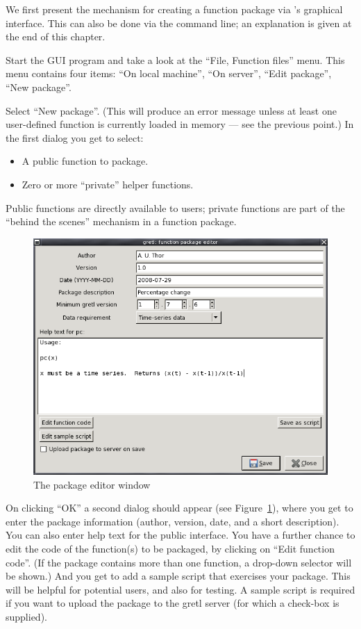 We first present the mechanism for creating a function package via
's graphical interface. This can also be done via the
command line; an explanation is given at the end of this chapter.

Start the GUI program and take a look at the ``File, Function files'' menu.
This menu contains four items: ``On local machine'', ``On server'', ``Edit
package'', ``New package''.

Select ``New package''.  (This will produce an error message unless at
least one user-defined function is currently loaded in memory --- see
the previous point.)  In the first dialog you get to select:

\begin{itemize}
\item A public function to package.
\item Zero or more ``private'' helper functions.
\end{itemize}

Public functions are directly available to users; private functions are
part of the ``behind the scenes'' mechanism in a function package.

\begin{figure}[htbp]
  \centering
  \includegraphics[scale=0.5]{figures/package_editor}
  \caption{The package editor window}
  \label{fig:package_editor}
\end{figure}

On clicking ``OK'' a second dialog should appear (see
Figure~\ref{fig:package_editor}), where you get to enter the package
information (author, version, date, and a short description).  You can
also enter help text for the public interface.  You have a further
chance to edit the code of the function(s) to be packaged, by clicking
on ``Edit function code''.  (If the package contains more than one
function, a drop-down selector will be shown.)  And you get to add a
sample script that exercises your package.  This will be helpful for
potential users, and also for testing.  A sample script is required if
you want to upload the package to the gretl server (for which a
check-box is supplied).

